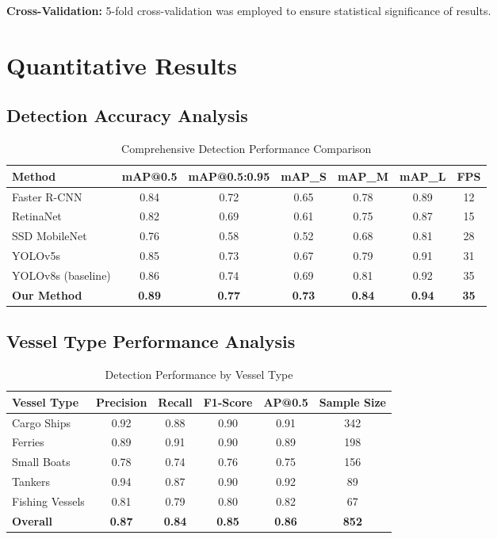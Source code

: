 \documentclass[12pt,a4paper]{report}
\begin{document}
\textbf{Cross-Validation:} 5-fold cross-validation was employed to ensure statistical significance of results.

\section{Quantitative Results}

\subsection{Detection Accuracy Analysis}

\begin{table}[H]
\centering
\caption{Comprehensive Detection Performance Comparison}
\label{tab:detection_performance}
\begin{tabular}{@{}lcccccc@{}}
\toprule
Method & mAP@0.5 & mAP@0.5:0.95 & mAP\_S & mAP\_M & mAP\_L & FPS \\
\midrule
Faster R-CNN & 0.84 & 0.72 & 0.65 & 0.78 & 0.89 & 12 \\
RetinaNet & 0.82 & 0.69 & 0.61 & 0.75 & 0.87 & 15 \\
SSD MobileNet & 0.76 & 0.58 & 0.52 & 0.68 & 0.81 & 28 \\
YOLOv5s & 0.85 & 0.73 & 0.67 & 0.79 & 0.91 & 31 \\
YOLOv8s (baseline) & 0.86 & 0.74 & 0.69 & 0.81 & 0.92 & 35 \\
\textbf{Our Method} & \textbf{0.89} & \textbf{0.77} & \textbf{0.73} & \textbf{0.84} & \textbf{0.94} & \textbf{35} \\
\bottomrule
\end{tabular}
\end{table}

\subsection{Vessel Type Performance Analysis}

\begin{table}[H]
\centering
\caption{Detection Performance by Vessel Type}
\label{tab:vessel_performance}
\begin{tabular}{@{}lccccc@{}}
\toprule
Vessel Type & Precision & Recall & F1-Score & AP@0.5 & Sample Size \\
\midrule
Cargo Ships & 0.92 & 0.88 & 0.90 & 0.91 & 342 \\
Ferries & 0.89 & 0.91 & 0.90 & 0.89 & 198 \\
Small Boats & 0.78 & 0.74 & 0.76 & 0.75 & 156 \\
Tankers & 0.94 & 0.87 & 0.90 & 0.92 & 89 \\
Fishing Vessels & 0.81 & 0.79 & 0.80 & 0.82 & 67 \\
\midrule
\textbf{Overall} & \textbf{0.87} & \textbf{0.84} & \textbf{0.85} & \textbf{0.86} & \textbf{852} \\
\bottomrule
\end{tabular}
\end{table}
\end{document}
